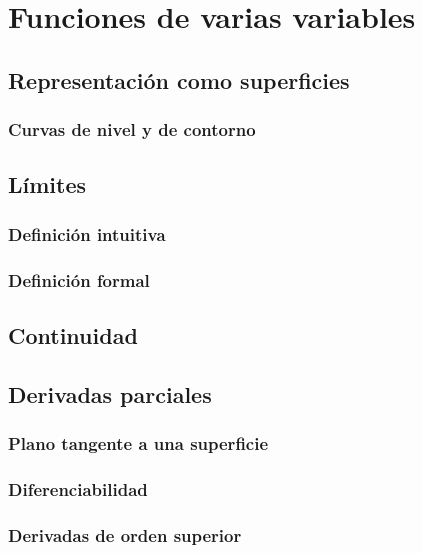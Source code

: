 \documentclass[12pt, fleqn]{report}                             %
\theoremstyle{break}                                            %
\begin{document}
    \chapter{Funciones de varias variables}
    
        \section{Representación como superficies}
        
            \subsection{Curvas de nivel y de contorno}
            
        \section{Límites}
            
            \subsection{Definición intuitiva}
            
            \subsection{Definición formal}
            
        \section{Continuidad}
        
        \section{Derivadas parciales}
        
            \subsection{Plano tangente a una superficie}
            
            \subsection{Diferenciabilidad}
            
            \subsection{Derivadas de orden superior}
            
\end{document}
